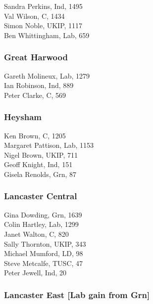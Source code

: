 \documentclass[a4paper,openany,10pt]{book}
\begin{document}


Sandra Perkins, Ind, 1495\\
Val Wilson, C, 1434\\
Simon Noble, UKIP, 1117\\
Ben Whittingham, Lab, 659\\


\subsubsection*{Great Harwood}



Gareth Molineux, Lab, 1279\\
Ian Robinson, Ind, 889\\
Peter Clarke, C, 569\\


\subsubsection*{Heysham}



Ken Brown, C, 1205\\
Margaret Pattison, Lab, 1153\\
Nigel Brown, UKIP, 711\\
Geoff Knight, Ind, 151\\
Gisela Renolds, Grn, 87\\


\subsubsection*{Lancaster Central}



Gina Dowding, Grn, 1639\\
Colin Hartley, Lab, 1299\\
Janet Walton, C, 820\\
Sally Thornton, UKIP, 343\\
Michael Mumford, LD, 98\\
Steve Metcalfe, TUSC, 47\\
Peter Jewell, Ind, 20\\


\subsubsection*{Lancaster East \hspace*{\fill}\nolinebreak[1]%
\enspace\hspace*{\fill}
[Lab gain from Grn]}
\end{document}
